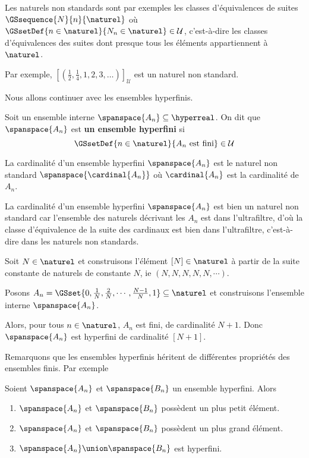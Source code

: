\documentclass[a4paper, 12pt]{report}
\begin{document}
Les naturels non standards sont par exemples les classes d'équivalences de
suites
$\GSsequence{N}{n}{\naturel}$ où $\GSsetDef{n \in \naturel}{N_{n} \in \naturel}
\in \mathcal{U}$, c'est-à-dire les classes d'équivalences des suites dont
presque tous les éléments appartiennent à $\naturel$.

Par exemple, $[(\frac{1}{2}, \frac{1}{4}, 1, 2, 3, \dots)]_{\mathcal{U}}$ est un
naturel non standard.

Nous allons continuer avec les ensembles hyperfinis.

\begin{definition} 
	Soit un ensemble interne $\spanspace{A_{n}} \subseteq \hyperreal$. On dit
	que $\spanspace{A_{n}}$ est \textbf{un ensemble hyperfini} si
	\begin{equation}
		\GSsetDef{n \in \naturel}{A_{n} \text{ est fini}} \in \mathcal{U}
	\end{equation}

	La cardinalité d'un ensemble hyperfini $\spanspace{A_{n}}$ est le naturel
	non standard $\spanspace{\cardinal{A_{n}}}$ où $\cardinal{A_{n}}$ est la
	cardinalité de $A_{n}$.
\end{definition}

\begin{remarque}
	La cardinalité d'un ensemble hyperfini $\spanspace{A_{n}}$ est bien un
	naturel non standard car l'ensemble des naturels décrivant les $A_{n}$ est
	dans l'ultrafiltre, d'où la classe d'équivalence de la suite des cardinaux
	est bien dans l'ultrafiltre, c'est-à-dire dans les naturels non standards.
\end{remarque}

\begin{exemple}
	Soit $N \in \naturel$ et construisons l'élément $[N] \in \naturel$ à partir
	de la suite constante de naturels de constante $N$, ie $(N, N, N, N, N,
	\cdots)$.

	Posons $A_{n} = \GSset{0, \frac{1}{N}, \frac{2}{N}, \cdots, \frac{N -
	1}{N}, 1} \subseteq \naturel$ et construisons l'ensemble interne
	$\spanspace{A_{n}}$.

	Alors, pour tous $n \in \naturel$, $A_{n}$ est fini, de cardinalité $N + 1$.
	Donc $\spanspace{A_{n}}$ est hyperfini de cardinalité $[N + 1]$.
\end{exemple}

Remarquons que les ensembles hyperfinis héritent de différentes propriétés des
ensembles finis. Par exemple
\begin{proposition}
	Soient $\spanspace{A_{n}}$ et $\spanspace{B_{n}}$ un ensemble hyperfini. Alors
	\begin{enumerate}
		\item $\spanspace{A_{n}}$ et $\spanspace{B_{n}}$ possèdent un plus petit élément.
		\item $\spanspace{A_{n}}$ et $\spanspace{B_{n}}$ possèdent un plus grand élément.
		\item $\spanspace{A_{n}} \union \spanspace{B_{n}}$ est hyperfini.
	\end{enumerate}
\end{proposition}
\end{document}
